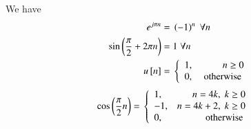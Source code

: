 \documentclass[journal,12pt,twocolumn]{IEEEtran}
\begin{document}
We have 
\begin{align}
\label{eq:2}
e^{j \pi n} ={}& \left(-1\right)^n \; \forall n\\
\label{eq:3}
\sin\left(\frac{\pi}{2}+2 \pi n\right) = {}& 1 \; \forall n\\
\label{eq:4}
u{}\left[n\right]={}& \left\{
  \begin{array}{lr} 
      1, & n\geq 0 \\
      0, & \text{ otherwise }
      \end{array}
\right.
\end{align}
\begin{align}
\label{eq:5}
\cos\left(\frac{\pi}{2} n\right) = {}& \left\{
  \begin{array}{lr} 
      1, & n = 4k,\; k\geq 0 \\
      -1, & n = 4k+2,\; k \geq 0 \\
      0, & \text{ otherwise }
      \end{array}
\right.
\end{align}
\end{document}
